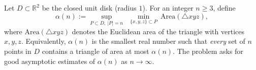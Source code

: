 Let $D\subset\mathbb R^2$ be the closed unit disk (radius $1$).
For an integer $n\ge 3$, define
\[
\alpha(n):=\sup_{P\subset D,\ |P|=n}\ \ \min_{\{x,y,z\}\subset P}\ \mathrm{Area}(\triangle xyz),
\]
where $\mathrm{Area}(\triangle xyz)$ denotes the Euclidean area of the triangle with vertices $x,y,z$.
Equivalently, $\alpha(n)$ is the smallest real number such that \emph{every} set of $n$ points in $D$ contains a triangle of area at most $\alpha(n)$.
The problem asks for good asymptotic estimates of $\alpha(n)$ as $n\to\infty$.
